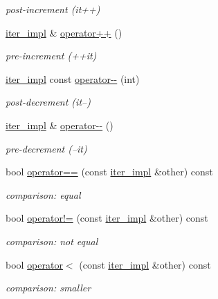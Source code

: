 \begin{DoxyCompactItemize}
\begin{DoxyCompactList}\small\item\em post-\/increment (it++) \end{DoxyCompactList}\item 
\hyperlink{classnlohmann_1_1detail_1_1iter__impl}{iter\+\_\+impl} \& \hyperlink{classnlohmann_1_1detail_1_1iter__impl_abdfe2a7f464400a7ab572782d14b922f}{operator++} ()
\begin{DoxyCompactList}\small\item\em pre-\/increment (++it) \end{DoxyCompactList}\item 
\hyperlink{classnlohmann_1_1detail_1_1iter__impl}{iter\+\_\+impl} const \hyperlink{classnlohmann_1_1detail_1_1iter__impl_a1fc43e764467b8ea4a4cdd01f629d757}{operator-\/-\/} (int)
\begin{DoxyCompactList}\small\item\em post-\/decrement (it--) \end{DoxyCompactList}\item 
\hyperlink{classnlohmann_1_1detail_1_1iter__impl}{iter\+\_\+impl} \& \hyperlink{classnlohmann_1_1detail_1_1iter__impl_a84e689fb581d651d130039f7cb81494a}{operator-\/-\/} ()
\begin{DoxyCompactList}\small\item\em pre-\/decrement (--it) \end{DoxyCompactList}\item 
bool \hyperlink{classnlohmann_1_1detail_1_1iter__impl_abe91c77d1be747fadcbfaf6f685e3ee7}{operator==} (const \hyperlink{classnlohmann_1_1detail_1_1iter__impl}{iter\+\_\+impl} \&other) const 
\begin{DoxyCompactList}\small\item\em comparison\+: equal \end{DoxyCompactList}\item 
bool \hyperlink{classnlohmann_1_1detail_1_1iter__impl_a66af27bbbf9743bc000264a0f89c5d0d}{operator!=} (const \hyperlink{classnlohmann_1_1detail_1_1iter__impl}{iter\+\_\+impl} \&other) const 
\begin{DoxyCompactList}\small\item\em comparison\+: not equal \end{DoxyCompactList}\item 
bool \hyperlink{classnlohmann_1_1detail_1_1iter__impl_a3a5123a4cfe72a9d674c9ff65c4ec08c}{operator$<$} (const \hyperlink{classnlohmann_1_1detail_1_1iter__impl}{iter\+\_\+impl} \&other) const 
\begin{DoxyCompactList}\small\item\em comparison\+: smaller \end{DoxyCompactList}\item 

\end{DoxyCompactItemize}
